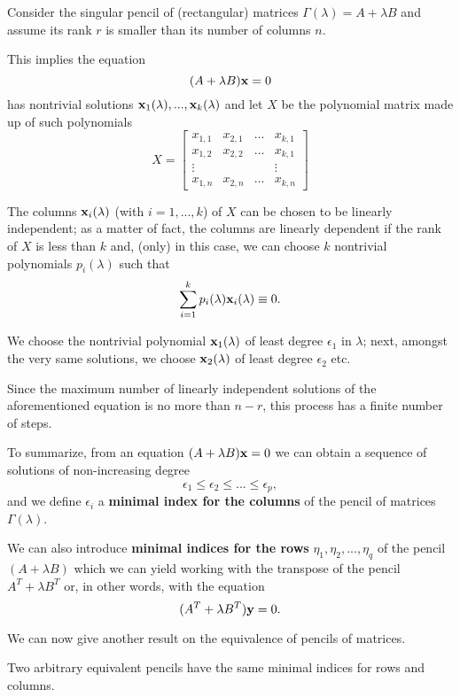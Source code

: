 Consider the singular pencil of (rectangular) matrices \(\Gamma(\lambda) = A + \lambda B\) and assume its rank \(r\) is smaller
than its number of columns \(n\).

This implies the equation
\[
    (A + \lambda B) \vb{x} = 0
\]
has nontrivial solutions \(\vb{x}_{1}(\lambda), ..., \vb{x}_{k}(\lambda)\) and let \(X\) be the polynomial
matrix made up of such polynomials
\[
    X =
    \begin{bmatrix}
        x_{1, 1} & x_{2, 1} & \ldots & x_{k, 1} \\
        x_{1, 2} & x_{2, 2} & \ldots & x_{k, 1} \\
        \vdots   &          &        &   \vdots \\
        x_{1, n} & x_{2, n} & \ldots & x_{k, n}
    \end{bmatrix}
\]

The columns \(\vb{x}_{i}(\lambda)\) (with \(i = 1, ..., k\)) of \(X\) can be chosen to be linearly independent; as a matter of
fact, the columns are linearly dependent if the rank of \(X\) is less than \(k\) and, (only) in this case, we can
choose \(k\) nontrivial polynomials \(p_{i}(\lambda)\) such that
\[
    \sum_{i=1}^{k} p_{i}(\lambda) \vb{x}_{i}(\lambda) \equiv 0.
\]

We choose the nontrivial polynomial \(\vb{x}_{1}(\lambda)\) of least degree \(\epsilon_{1}\) in \(\lambda\); next,
amongst the very same solutions, we choose \(\vb{x}_{2}(\lambda)\) of least degree \(\epsilon_{2}\) etc.

Since the maximum number of linearly independent solutions of the aforementioned equation
is no more than \(n - r\), this process has a finite number of steps.

To summarize, from an equation \((A + \lambda B)\vb{x} = 0\) we can obtain a sequence of solutions of non-increasing degree
\[
    \epsilon_{1} \leq \epsilon_{2} \leq ... \leq \epsilon_{p},
\]
and we define \(\epsilon_{i}\) a \textbf{minimal index for the columns} of the pencil of matrices \(\Gamma(\lambda)\).

We can also introduce \textbf{minimal indices for the rows} \(\eta_{1}, \eta_{2}, ..., \eta_{q}\) of the pencil
\((A + \lambda B)\) which we can yield working with the transpose of the pencil \(A^T + \lambda B^T\) or, in other words,
with the equation
\[
    (A^T + \lambda B^T)\vb{y} = 0.
\]

We can now give another result on the equivalence of pencils of matrices.

\begin{theorem}\label{thm:singular-pencils}
    Two arbitrary equivalent pencils have the same minimal indices for rows and columns.
\end{theorem}

